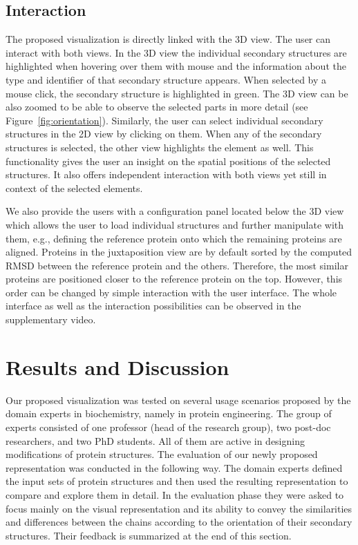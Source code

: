 \documentclass[twocolumn]{bmcart}%
\begin{document}
\subsection*{Interaction}
The proposed visualization is directly linked with the 3D view.
The user can interact with both views.
In the 3D view the individual secondary structures are highlighted when hovering over them with mouse and the information about the type and identifier of that secondary structure appears.
When selected by a mouse click, the secondary structure is highlighted in green.
The 3D view can be also zoomed to be able to observe the selected parts in more detail (see Figure~\ref{fig:orientation}).
Similarly, the user can select individual secondary structures in the 2D view by clicking on them.
When any of the secondary structures is selected, the other view highlights the element as well.
This functionality gives the user an insight on the spatial positions of the selected structures.
It also offers independent interaction with both views yet still in context of the selected elements.

We also provide the users with a configuration panel located below the 3D view which allows the user to load individual structures and further manipulate with them, e.g., defining the reference protein onto which the remaining proteins are aligned.
Proteins in the juxtaposition view are by default sorted by the computed RMSD between the reference protein and the others.
Therefore, the most similar proteins are positioned closer to the reference protein on the top.
However, this order can be changed by simple interaction with the user interface.   
The whole interface as well as the interaction possibilities can be observed in the supplementary video.

\section*{Results and Discussion}
Our proposed visualization was tested on several usage scenarios proposed by the domain experts in biochemistry, namely in protein engineering.
The group of experts consisted of one professor (head of the research group), two post-doc researchers, and two PhD students.
All of them are active in designing modifications of protein structures.
The evaluation of our newly proposed representation was conducted in the following way.
The domain experts defined the input sets of protein structures and then used the resulting representation to compare and explore them in detail. 
In the evaluation phase they were asked to focus mainly on the visual representation and its ability to convey the similarities and differences between the chains according to the orientation of their secondary structures.
Their feedback is summarized at the end of this section.
\end{document}
